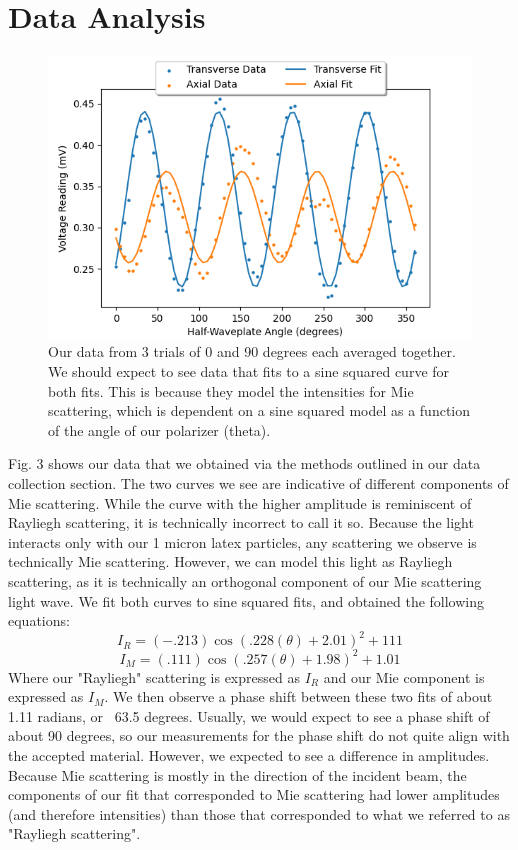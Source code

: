 \documentclass[10pt,letterpaper,onecolumn]{article}
\begin{document}
\section{Data Analysis}
\begin{figure}
    \begin{center}
        \includegraphics*[width=4.5in]{plot.png}
        \caption{Our data from 3 trials of 0 and 90 degrees each averaged together. We should expect to see data that fits to a sine squared curve for both fits. This is because they model the intensities for Mie scattering, which is dependent on a sine squared model as a function of the angle of our polarizer (theta).}
    \end{center}
\end{figure}
Fig. 3 shows our data that we obtained via the methods outlined in our data collection section. The two curves we see are indicative of different components of Mie scattering. While the curve with the higher amplitude is reminiscent of Rayliegh scattering, it is technically incorrect to call it so. 
Because the light interacts only with our 1 micron latex particles, any scattering we observe is technically Mie scattering. However, we can model this light as Rayliegh scattering, as it is technically an orthogonal component of our Mie scattering light wave. We fit both curves to sine squared fits, and obtained the following equations:
$$
I_R = (-.213)\cos(.228(\theta) + 2.01)^2+111
$$$$
I_M = (.111)\cos(.257(\theta) + 1.98)^2+1.01
$$
Where our "Rayliegh" scattering is expressed as $I_R$ and our Mie component is expressed as $I_M$.
We then observe a phase shift between these two fits of about 1.11 radians, or ~63.5 degrees. Usually, we would expect to see a phase shift of about 90 degrees, so our measurements for the phase shift do not quite align with the accepted material.
However, we expected to see a difference in amplitudes. Because Mie scattering is mostly in the direction of the incident beam, the components of our fit that corresponded to Mie scattering had lower amplitudes (and therefore intensities) than those that
corresponded to what we referred to as "Rayliegh scattering".
\end{document}
